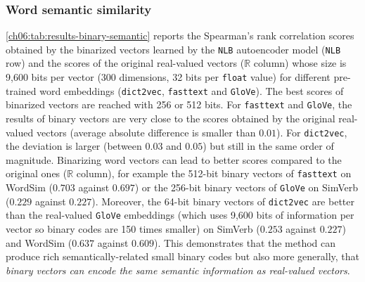     \subsubsection{Word semantic similarity}
      \autoref{ch06:tab:results-binary-semantic} reports the Spearman's rank
      correlation scores obtained by the binarized vectors learned by the
      \texttt{NLB} autoencoder model (\texttt{NLB} row) and the scores of the
      original real-valued vectors ($\mathbb{R}$ column) whose size is 9,600
      bits per vector (300 dimensions, 32 bits per \texttt{float} value) for
      different pre-trained word embeddings (\texttt{dict2vec},
      \texttt{fasttext} and \texttt{GloVe}). The best scores of binarized
      vectors are reached with 256 or 512 bits. For \texttt{fasttext} and
      \texttt{GloVe}, the results of binary vectors are very close to the scores
      obtained by the original real-valued vectors (average absolute difference
      is smaller than $0.01$). For \texttt{dict2vec}, the deviation is larger
      (between $0.03$ and $0.05$) but still in the same order of magnitude.
      Binarizing word vectors can lead to better scores compared to the original
      ones ($\mathbb{R}$ column), for example the 512-bit binary vectors of
      \texttt{fasttext} on WordSim ($0.703$ against $0.697$) or the 256-bit binary
      vectors of \texttt{GloVe} on SimVerb ($0.229$ against $0.227$). Moreover,
      the 64-bit binary vectors of \texttt{dict2vec} are better than the
      real-valued \texttt{GloVe} embeddings (which uses 9,600 bits of
      information per vector so binary codes are 150 times smaller) on SimVerb
      ($0.253$ against $0.227$) and WordSim ($0.637$ against $0.609$). This
      demonstrates that the method can produce rich semantically-related small
      binary codes but also more generally, that \textit{binary vectors can
      encode the same semantic information as real-valued vectors}.\bigskip


